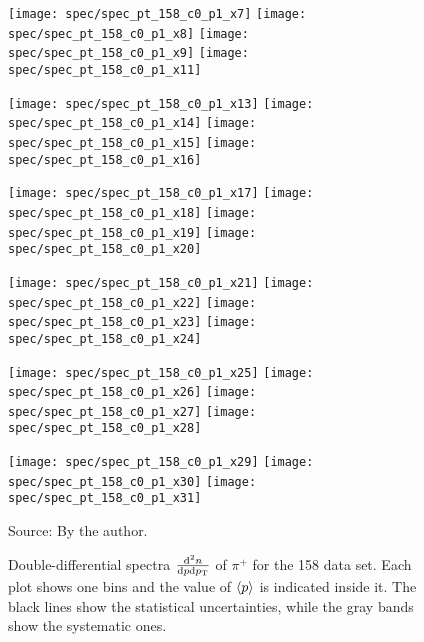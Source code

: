 \clearpage

\begin{figure}[!ht]
  \centering

  \texttt{[image: spec/spec\_pt\_158\_c0\_p1\_x7]}
  \texttt{[image: spec/spec\_pt\_158\_c0\_p1\_x8]}
  \texttt{[image: spec/spec\_pt\_158\_c0\_p1\_x9]}
  \texttt{[image: spec/spec\_pt\_158\_c0\_p1\_x11]}

  \texttt{[image: spec/spec\_pt\_158\_c0\_p1\_x13]}
  \texttt{[image: spec/spec\_pt\_158\_c0\_p1\_x14]}
  \texttt{[image: spec/spec\_pt\_158\_c0\_p1\_x15]}
  \texttt{[image: spec/spec\_pt\_158\_c0\_p1\_x16]}

  \texttt{[image: spec/spec\_pt\_158\_c0\_p1\_x17]}
  \texttt{[image: spec/spec\_pt\_158\_c0\_p1\_x18]}
  \texttt{[image: spec/spec\_pt\_158\_c0\_p1\_x19]}
  \texttt{[image: spec/spec\_pt\_158\_c0\_p1\_x20]}

  \texttt{[image: spec/spec\_pt\_158\_c0\_p1\_x21]}
  \texttt{[image: spec/spec\_pt\_158\_c0\_p1\_x22]}
  \texttt{[image: spec/spec\_pt\_158\_c0\_p1\_x23]}
  \texttt{[image: spec/spec\_pt\_158\_c0\_p1\_x24]}

  \texttt{[image: spec/spec\_pt\_158\_c0\_p1\_x25]}
  \texttt{[image: spec/spec\_pt\_158\_c0\_p1\_x26]}
  \texttt{[image: spec/spec\_pt\_158\_c0\_p1\_x27]}
  \texttt{[image: spec/spec\_pt\_158\_c0\_p1\_x28]}

  \texttt{[image: spec/spec\_pt\_158\_c0\_p1\_x29]}
  \texttt{[image: spec/spec\_pt\_158\_c0\_p1\_x30]}
  \texttt{[image: spec/spec\_pt\_158\_c0\_p1\_x31]}

  \caption{Double-differential spectra $\frac{\text{d}^2n}{\text{d}p\text{d}p_\text{T}}$
    of $\pi^+$ for the 158 \GeVc data set. Each plot shows one \pp bins and the value
    of $\langle p\rangle$ is indicated inside it. The black lines show the statistical
    uncertainties, while the gray bands show the systematic ones.}
  \label{fig:hadron:spec:dedx:all158:c0p1}
  \begin{center}
    \small Source: By the author. 
  \end{center}
\end{figure}

